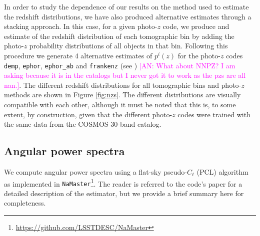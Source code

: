 \documentclass[a4paper,11pt]{article}
\newcommand{\an}[1]{{\textcolor{magenta}{[AN: #1]}}}
\begin{document}
    In order to study the dependence of our results on the method used to estimate the redshift distributions, we have also produced alternative estimates through a stacking approach. In this case, for a given photo-$z$ code, we produce and estimate of the redshift distribution of each tomographic bin by adding the photo-$z$ probability distributions of all objects in that bin. Following this procedure we generate 4 alternative estimates of $p^i(z)$ for the photo-$z$ codes {\tt demp}, {\tt ephor}, {\tt ephor\_ab} and {\tt frankenz} (see \cite{2018PASJ...70S...9T}) \an{What about NNPZ? I am asking because it is in the catalogs but I never got it to work as the pzs are all nan.}. The different redshift distributions for all tomographic bins and photo-$z$ methods are shown in Figure \ref{fig:nzs}. The different distributions are visually compatible with each other, although it must be noted that this is, to some extent, by construction, given that the different photo-$z$ codes were trained with the same data from the COSMOS 30-band catalog.

  \subsection{Angular power spectra}\label{ssec:methods.cell}
    We compute angular power spectra using a flat-sky pseudo-$C_\ell$ (PCL) algorithm \citep{2002ApJ...567....2H} as implemented in {\tt NaMaster}\footnote{\url{https://github.com/LSSTDESC/NaMaster}}. The reader is referred to the code's paper \cite{2019MNRAS.484.4127A} for a detailed description of the estimator, but we provide a brief summary here for completeness.
    
\end{document}
